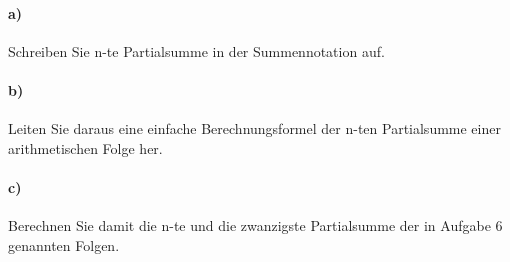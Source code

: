 \documentclass[paper=a4, fontsize=11pt]{scrartcl}
\numberwithin{equation}{section}
\numberwithin{figure}{section}
\numberwithin{table}{section}
\begin{document}
\paragraph{a)}
Schreiben Sie n-te Partialsumme in der Summennotation auf.

\paragraph{b)}
Leiten Sie daraus eine einfache Berechnungsformel der n-ten Partialsumme einer arithmetischen Folge her.

\paragraph{c)}
Berechnen Sie damit die n-te und die zwanzigste Partialsumme der in Aufgabe 6 genannten Folgen.

\end{document}
